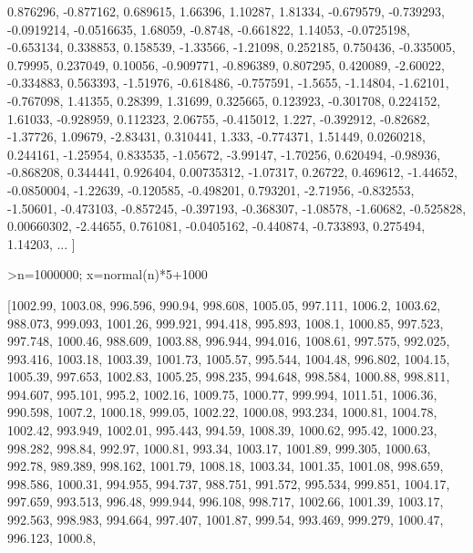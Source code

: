 \documentclass{article}
\begin{document}
\begin{eulernotebook}
\begin{eulercomment}
\begin{eulercomment}
\begin{euleroutput}
  0.876296,  -0.877162,  0.689615,  1.66396,  1.10287,  1.81334,
  -0.679579,  -0.739293,  -0.0919214,  -0.0516635,  1.68059,  -0.8748,
  -0.661822,  1.14053,  -0.0725198,  -0.653134,  0.338853,  0.158539,
  -1.33566,  -1.21098,  0.252185,  0.750436,  -0.335005,  0.79995,
  0.237049,  0.10056,  -0.909771,  -0.896389,  0.807295,  0.420089,
  -2.60022,  -0.334883,  0.563393,  -1.51976,  -0.618486,  -0.757591,
  -1.5655,  -1.14804,  -1.62101,  -0.767098,  1.41355,  0.28399,
  1.31699,  0.325665,  0.123923,  -0.301708,  0.224152,  1.61033,
  -0.928959,  0.112323,  2.06755,  -0.415012,  1.227,  -0.392912,
  -0.82682,  -1.37726,  1.09679,  -2.83431,  0.310441,  1.333,
  -0.774371,  1.51449,  0.0260218,  0.244161,  -1.25954,  0.833535,
  -1.05672,  -3.99147,  -1.70256,  0.620494,  -0.98936,  -0.868208,
  0.344441,  0.926404,  0.00735312,  -1.07317,  0.26722,  0.469612,
  -1.44652,  -0.0850004,  -1.22639,  -0.120585,  -0.498201,  0.793201,
  -2.71956,  -0.832553,  -1.50601,  -0.473103,  -0.857245,  -0.397193,
  -0.368307,  -1.08578,  -1.60682,  -0.525828,  0.00660302,  -2.44655,
  0.761081,  -0.0405162,  -0.440874,  -0.733893,  0.275494,  1.14203,
   ... ]
\end{euleroutput}
\begin{eulerprompt}
>n=1000000; x=normal(n)*5+1000
\end{eulerprompt}
\begin{euleroutput}
  [1002.99,  1003.08,  996.596,  990.94,  998.608,  1005.05,  997.111,
  1006.2,  1003.62,  988.073,  999.093,  1001.26,  999.921,  994.418,
  995.893,  1008.1,  1000.85,  997.523,  997.748,  1000.46,  988.609,
  1003.88,  996.944,  994.016,  1008.61,  997.575,  992.025,  993.416,
  1003.18,  1003.39,  1001.73,  1005.57,  995.544,  1004.48,  996.802,
  1004.15,  1005.39,  997.653,  1002.83,  1005.25,  998.235,  994.648,
  998.584,  1000.88,  998.811,  994.607,  995.101,  995.2,  1002.16,
  1009.75,  1000.77,  999.994,  1011.51,  1006.36,  990.598,  1007.2,
  1000.18,  999.05,  1002.22,  1000.08,  993.234,  1000.81,  1004.78,
  1002.42,  993.949,  1002.01,  995.443,  994.59,  1008.39,  1000.62,
  995.42,  1000.23,  998.282,  998.84,  992.97,  1000.81,  993.34,
  1003.17,  1001.89,  999.305,  1000.63,  992.78,  989.389,  998.162,
  1001.79,  1008.18,  1003.34,  1001.35,  1001.08,  998.659,  998.586,
  1000.31,  994.955,  994.737,  988.751,  991.572,  995.534,  999.851,
  1004.17,  997.659,  993.513,  996.48,  999.944,  996.108,  998.717,
  1002.66,  1001.39,  1003.17,  992.563,  998.983,  994.664,  997.407,
  1001.87,  999.54,  993.469,  999.279,  1000.47,  996.123,  1000.8,

\end{euleroutput}
\end{eulercomment}
\end{eulercomment}
\end{eulernotebook}
\end{document}
